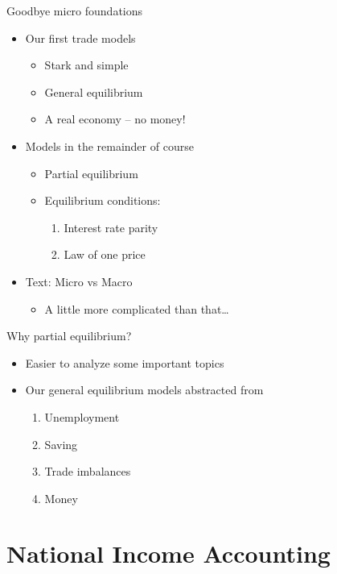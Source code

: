 \documentclass[10pt,hyperref={CJKbookmarks=true},xcolor=dvipsnames,aspectratio=169]{beamer}
\begin{document}
\begin{frame}{Goodbye micro foundations}

\begin{itemize}
	\item Our first trade models
	\begin{itemize}
		\item Stark and simple
		\item General equilibrium
		\item A real economy -- no money!
	\end{itemize}
	\item Models in the remainder of course
	\begin{itemize}
		\item Partial equilibrium
		\item Equilibrium conditions:
		\begin{enumerate}
			\item Interest rate parity
			\item Law of one price
		\end{enumerate}
	\end{itemize}
	\item Text: Micro vs Macro
	\begin{itemize}
		\item A little more complicated than that\dots
	\end{itemize}
\end{itemize}

\end{frame}

\begin{frame}{Why partial equilibrium?}

\begin{itemize}
\item Easier to analyze some important topics
\item Our general equilibrium models abstracted from
\begin{enumerate}
	\item Unemployment
	\item Saving
	\item Trade imbalances
	\item Money
\end{enumerate}

\end{itemize}

\end{frame}

\section{National Income Accounting}
\end{document}
